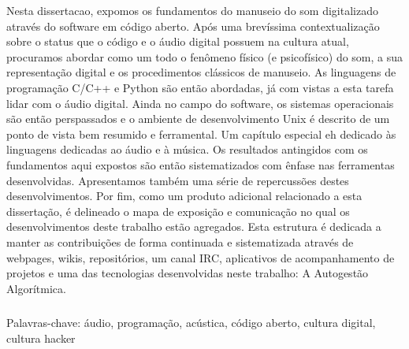 \begin{resumo}

Nesta dissertacao, expomos os fundamentos do manuseio do som digitalizado através do software em código aberto.
Após uma brevíssima contextualização sobre o status que o código e o áudio digital possuem na cultura atual, procuramos abordar como um todo o fenômeno
físico (e psicofísico) do som, a sua representação digital e os procedimentos clássicos de manuseio. As linguagens de programação C/C++ e Python
são então abordadas, já com vistas a esta tarefa lidar com o áudio digital. Ainda no campo do software,
os sistemas operacionais são então perspassados e o ambiente de desenvolvimento Unix é descrito de um ponto
de vista bem resumido e ferramental. Um capítulo especial eh dedicado às linguagens dedicadas ao áudio e à música.
Os resultados antingidos com os fundamentos aqui expostos são então sistematizados com ênfase nas ferramentas desenvolvidas.
Apresentamos também uma série de repercussões destes desenvolvimentos.
Por fim, como um produto adicional relacionado a esta dissertação, é delineado o mapa de exposição e comunicação no qual
os desenvolvimentos deste trabalho estão agregados. Esta estrutura é dedicada a manter as contribuições
de forma continuada e sistematizada através de webpages, wikis, repositórios, um canal IRC, aplicativos de acompanhamento de projetos
e uma das tecnologias desenvolvidas neste trabalho: A Autogestão Algorítmica.


$\phantom{linha em branco}$\\
Palavras-chave: áudio, programação, acústica, código aberto, cultura digital, cultura hacker

\end{resumo}

